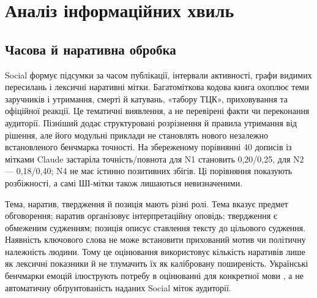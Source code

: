 \section{Аналіз інформаційних хвиль}
\subsection{Часова й наративна обробка}
Social формує підсумки за часом публікації, інтервали активності, графи видимих пересилань і лексичні наративні мітки. Багатоміткова кодова книга охоплює теми заручників і утримання, смерті й катувань, «табору ТЦК», приховування та офіційної реакції. Це тематичні виявлення, а не перевірені факти чи переконання аудиторії. Пізніший  додає структуровані розрізнення й правила утримання від рішення, але його модульні приклади не становлять нового незалежно встановленого бенчмарка точності. На збереженому порівнянні 40 дописів із мітками Claude застаріла точність/повнота для N1 становить 0,20/0,25, для N2 --- 0,18/0,40; N4 не має істинно позитивних збігів. Ці порівняння показують розбіжності, а самі ШІ-мітки також лишаються невизначеними.

Тема, наратив, твердження й позиція мають різні ролі. Тема вказує предмет обговорення; наратив організовує інтерпретаційну оповідь; твердження є обмеженим судженням; позиція описує ставлення тексту до цільового судження. Наявність ключового слова не може встановити прихований мотив чи політичну належність людини. Тому це оцінювання використовує кількість наративів лише як лексичні показники й не тлумачить їх як калібровану поширеність. Українські бенчмарки емоцій ілюструють потребу в оцінюванні для конкретної мови \citep{dementieva2025emobench}, а не автоматичну обґрунтованість наданих Social міток аудиторії.

